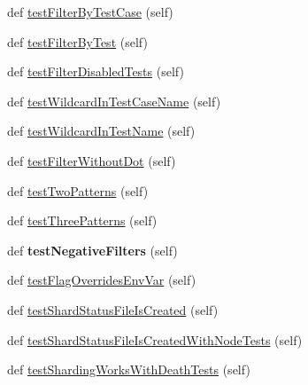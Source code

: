 \begin{DoxyCompactItemize}
\item 
def \hyperlink{classgoogletest-filter-unittest_1_1GTestFilterUnitTest_ac67334a27bf7aaf4d817d41e6bcd4469}{test\+Filter\+By\+Test\+Case} (self)
\item 
def \hyperlink{classgoogletest-filter-unittest_1_1GTestFilterUnitTest_a5665345aa2e94412fd65b19bc5077342}{test\+Filter\+By\+Test} (self)
\item 
def \hyperlink{classgoogletest-filter-unittest_1_1GTestFilterUnitTest_ada479753ed1c6007647252922f713ffc}{test\+Filter\+Disabled\+Tests} (self)
\item 
def \hyperlink{classgoogletest-filter-unittest_1_1GTestFilterUnitTest_a6bc13581aeb86a199706fd2592b5b5e5}{test\+Wildcard\+In\+Test\+Case\+Name} (self)
\item 
def \hyperlink{classgoogletest-filter-unittest_1_1GTestFilterUnitTest_a57c51a39e4e5578dc6e0a0dd47c2875c}{test\+Wildcard\+In\+Test\+Name} (self)
\item 
def \hyperlink{classgoogletest-filter-unittest_1_1GTestFilterUnitTest_a3a7d87e91ab92004b55affc8a0f76305}{test\+Filter\+Without\+Dot} (self)
\item 
def \hyperlink{classgoogletest-filter-unittest_1_1GTestFilterUnitTest_a7b2e7e1424bd6be9cbd15a401017c442}{test\+Two\+Patterns} (self)
\item 
def \hyperlink{classgoogletest-filter-unittest_1_1GTestFilterUnitTest_aab0836fe1e7c7c6af6b8b94f08475d3b}{test\+Three\+Patterns} (self)
\item 
\mbox{\label{classgoogletest-filter-unittest_1_1GTestFilterUnitTest_a8484038c90290d2a4a50a3ab3601436e}} 
def {\bfseries test\+Negative\+Filters} (self)
\item 
def \hyperlink{classgoogletest-filter-unittest_1_1GTestFilterUnitTest_a3cfc062fbcc396bfaa94184e10e3ae39}{test\+Flag\+Overrides\+Env\+Var} (self)
\item 
def \hyperlink{classgoogletest-filter-unittest_1_1GTestFilterUnitTest_a48fd50fa58d23ba0521a9388aea0c688}{test\+Shard\+Status\+File\+Is\+Created} (self)
\item 
def \hyperlink{classgoogletest-filter-unittest_1_1GTestFilterUnitTest_a7c436b2599ace8d6e32d17fd08a98178}{test\+Shard\+Status\+File\+Is\+Created\+With\+Node\+Tests} (self)
\item 
def \hyperlink{classgoogletest-filter-unittest_1_1GTestFilterUnitTest_a8998f6f4842fa2cbde0428fa0c4ba437}{test\+Sharding\+Works\+With\+Death\+Tests} (self)
\end{DoxyCompactItemize}


